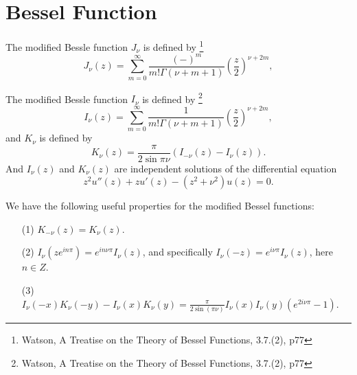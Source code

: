 \section{Bessel Function}

\begin{definition} \label{D:bessel}
The modified Bessle function $J_{\nu}$ is defined by 
\footnote{Watson, A Treatise on the Theory of Bessel Functions, 3.7.(2), p77}
\begin{equation}
  J_{\nu}(z) = \sum_{m=0}^{\infty} \frac{(-)^m}{m! \Gamma(\nu+m+1)}
                \left(\frac{z}{2}\right)^{\nu+2m},
\end{equation}
\end{definition}

\begin{definition} \label{D:bessel_mod}
The modified Bessle function $I_{\nu}$ is defined by 
\footnote{Watson, A Treatise on the Theory of Bessel Functions, 3.7.(2), p77}
\begin{equation}
  I_{\nu}(z) = \sum_{m=0}^{\infty} \frac{1}{m! \Gamma(\nu+m+1)}
                \left(\frac{z}{2}\right)^{\nu+2m},
\end{equation}
and $K_{\nu}$ is defined by
\begin{equation}
  K_{\nu}(z)=\frac{\pi}{2\sin{\pi\nu}} (I_{-\nu}(z) - I_{\nu}(z)).
\end{equation}
And $I_{\nu}(z)$ and $K_{\nu}(z)$ are independent solutions of the differential 
equation
\begin{equation}
  z^2 u''(z)+ z u'(z) - (z^2+\nu^2) u(z) = 0.
\end{equation}
\end{definition}

\begin{proposition} \label{P:bessel_mod}
We have the following useful properties for the modified Bessel functions:
\begin{enumerate}
  \item[(1)] $K_{-\nu}(z) = K_{\nu}(z)$.
  \item[(2)] $I_{\nu}(z e^{in\pi}) = e^{in\nu\pi} I_{\nu}(z)$, and specifically
             $I_{\nu}(-z)=e^{i\nu\pi}I_{\nu}(z)$, here $n\in Z$.
  \item[(3)] $I_{\nu}(-x) K_{\nu}(-y) -I_{\nu}(x) K_{\nu}(y) =
  \frac{\pi}{2\sin(\pi\nu)} I_{\nu}(x) I_{\nu}(y) (e^{2i\nu\pi}-1)$.
\end{enumerate}
\end{proposition}
